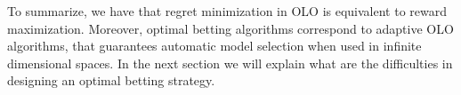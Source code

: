 To summarize, we have that regret minimization in OLO is equivalent to reward maximization. Moreover, optimal betting algorithms correspond to adaptive OLO algorithms, that guarantees automatic model selection when used in infinite dimensional spaces. In the next section we will explain what are the difficulties in designing an optimal betting strategy.